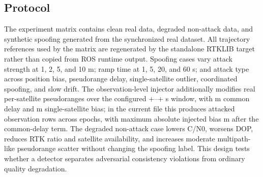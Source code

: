 \documentclass[journal]{IEEEtran}
\begin{document}
\subsection{Protocol}
The experiment matrix contains clean real data, degraded non-attack data, and synthetic spoofing generated from the synchronized real dataset.
All trajectory references used by the matrix are regenerated by the standalone RTKLIB target rather than copied from ROS runtime output.
Spoofing cases vary attack strength at 1, 2, 5, and 10 m; ramp time at 1, 5, 20, and 60 s; and attack type across position bias, pseudorange delay, single-satellite outlier, coordinated spoofing, and slow drift.
The observation-level injector additionally modifies real per-satellite pseudoranges over the configured +\ObservationAttackStart{}--+\ObservationAttackEnd{} s window, with \ObservationAttackCommonDelay{} m common delay and \ObservationAttackPerSatelliteBias{} m single-satellite bias; in the current file this produces \ObservationAttackRows{} attacked observation rows across \ObservationAttackEpochs{} epochs, with maximum absolute injected bias \ObservationAttackMaxBias{} m after the common-delay term.
The degraded non-attack case lowers C/N0, worsens DOP, reduces RTK ratio and satellite availability, and increases moderate multipath-like pseudorange scatter without changing the spoofing label.
This design tests whether a detector separates adversarial consistency violations from ordinary quality degradation.
\end{document}
